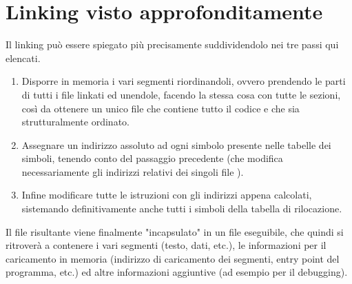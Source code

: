 \documentclass[class=book, crop=false, oneside]{standalone}
\begin{document}
\section{Linking visto approfonditamente}
Il linking può essere spiegato più precisamente suddividendolo nei tre passi qui elencati.
\begin{enumerate}
	\item Disporre in memoria i vari segmenti riordinandoli, ovvero prendendo le parti  di tutti i file  linkati ed unendole, facendo la stessa cosa con tutte le sezioni, così da ottenere un unico file  che contiene tutto il codice e che sia strutturalmente ordinato.
	\item Assegnare un indirizzo assoluto ad ogni simbolo presente nelle tabelle dei simboli, tenendo conto del passaggio precedente (che modifica necessariamente gli indirizzi relativi dei singoli file ).
	\item Infine modificare tutte le istruzioni con gli indirizzi appena calcolati, sistemando definitivamente anche tutti i simboli della tabella di rilocazione.
\end{enumerate}
Il file risultante viene finalmente "incapsulato" in un file eseguibile, che quindi si ritroverà a contenere i vari segmenti (testo, dati, etc.), le informazioni per il caricamento in memoria (indirizzo di caricamento dei segmenti, entry point del programma, etc.) ed altre informazioni aggiuntive (ad esempio per il debugging).
\end{document}
